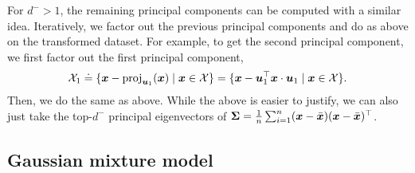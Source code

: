 For $d^- > 1$, the remaining principal components can be computed with a similar idea. Iteratively,
we factor out the previous principal components and do as above on the transformed dataset. For
example, to get the second principal component, we first factor out the first principal component, \[
    \mathcal{X}_1 \doteq \{ \bm{x} - \mathrm{proj}_{\bm{u}_1}(\bm{x}) \mid \bm{x} \in \mathcal{X} \} = \{ \bm{x} - \bm{u}_1^\top \bm{x} \cdot \bm{u}_1 \mid \bm{x} \in \mathcal{X} \} .
\]
Then, we do the same as above. While the above is easier to justify, we can also just take the
top-$d^-$ principal eigenvectors of $\bm{\Sigma} = \frac{1}{n} \sum_{i=1}^{n}
    (\bm{x}-\bar{\bm{x}})(\bm{x}-\bar{\bm{x}})^\top$.

\subsection{Gaussian mixture model}

